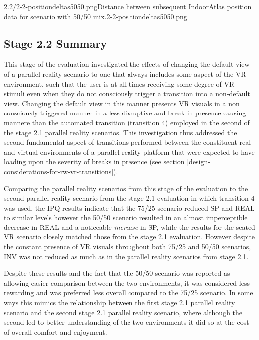        {2.2/2-2-positiondeltas5050.png}{Distance between subsequent IndoorAtlas position data for scenario with 50/50 mix.}{2-2-positiondeltas5050.png}


\subsection{Stage 2.2 Summary}

This stage of the evaluation investigated the effects of changing the default view of a parallel reality scenario to one that always includes some aspect of the VR environment, such that the user is at all times receiving some degree of VR stimuli even when they do not consciously trigger a transition into a non-default view. Changing the default view in this manner presents VR visuals in a non consciously triggered manner in a less disruptive and break in presence causing mannere than the automated transition (transition 4) employed in the second of the stage 2.1 parallel reality scenarios. This investigation thus addressed the second fundamental aspect of transitions performed between the constituent real and virtual environments of a parallel reality platform that were expected to have loading upon the severity of breaks in presence (see section \ref{design-considerations-for-rw-vr-transitions}).

Comparing the parallel reality scenarios from this stage of the evaluation to the second parallel reality scenario from the stage 2.1 evaluation in which transition 4 was used, the IPQ results indicate that the 75/25 scenario reduced SP and REAL to similar levels however the 50/50 scenario resulted in an almost imperceptible decrease in REAL and a noticeable \textit{increase} in SP, while the results for the seated VR scenario closely matched those from the stage 2.1 evaluation. However despite the constant presence of VR visuals throughout both 75/25 and 50/50 scenarios, INV was not reduced as much as in the parallel reality scenarios from stage 2.1.

Despite these results and the fact that the 50/50 scenario was reported as allowing easier comparison between the two environments, it was considered less rewarding and was preferred less overall compared to the 75/25 scenario. In some ways this mimics the relationship between the first stage 2.1 parallel reality scenario and the second stage 2.1 parallel reality scenario, where although the second led to better understanding of the two environments it did so at the cost of overall comfort and enjoyment.

